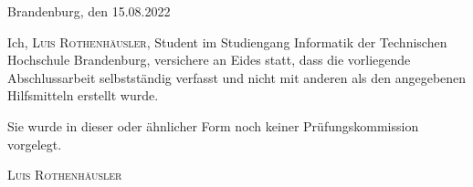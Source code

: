 \thispagestyle{empty}

\large
\begin{flushright}
  Brandenburg, den 15.08.2022
\end{flushright}

\vspace*{50mm}
Ich, {\scshape Luis Rothenhäusler}, Student im Studiengang Informatik der Technischen Hochschule Brandenburg, versichere an Eides statt, dass die vorliegende Abschlussarbeit selbstständig verfasst und nicht mit anderen als den
angegebenen Hilfsmitteln erstellt wurde.

Sie wurde in dieser oder ähnlicher Form noch keiner Prüfungskommission vorgelegt.

\vspace*{50mm}

\begin{flushright}
  {\scshape Luis Rothenhäusler}
\end{flushright}

\normalsize